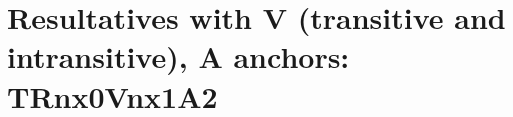 
\section{Resultatives with V (transitive and intransitive), A anchors: TRnx0Vnx1A2}
\label{tr-result_A}

